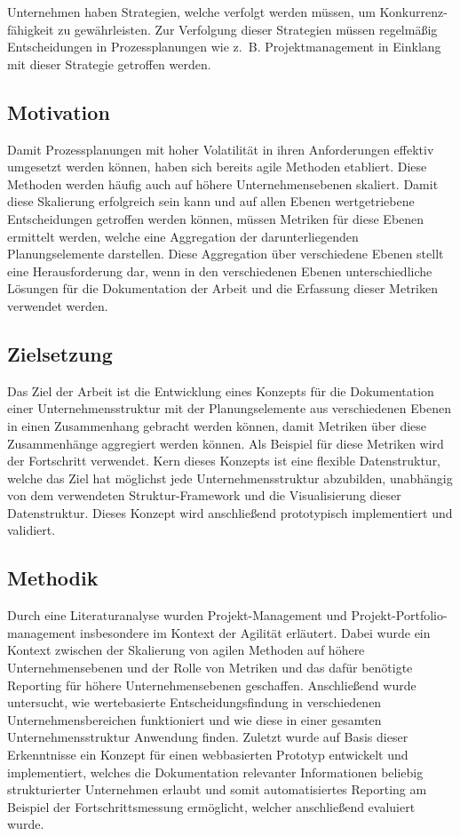 Unternehmen haben Strategien, welche verfolgt werden müssen, um Konkurrenz-fähigkeit zu gewährleisten. Zur Verfolgung dieser Strategien müssen regelmäßig Entscheidungen in Prozessplanungen wie z. B. Projektmanagement in Einklang mit dieser Strategie getroffen werden.

\subsection{Motivation}
Damit Prozessplanungen mit hoher Volatilität in ihren Anforderungen effektiv umgesetzt werden können, haben sich bereits agile Methoden etabliert. Diese Methoden werden häufig auch auf höhere Unternehmensebenen skaliert. Damit diese Skalierung erfolgreich sein kann und auf allen Ebenen wertgetriebene Entscheidungen getroffen werden können, müssen Metriken für diese Ebenen ermittelt werden, welche eine Aggregation der darunterliegenden Planungselemente darstellen. Diese Aggregation über verschiedene Ebenen stellt eine Herausforderung dar, wenn in den verschiedenen Ebenen unterschiedliche Lösungen für die Dokumentation der Arbeit und die Erfassung dieser Metriken verwendet werden.

\subsection{Zielsetzung}
Das Ziel der Arbeit ist die Entwicklung eines Konzepts für die Dokumentation einer Unternehmensstruktur mit der Planungselemente aus verschiedenen Ebenen in einen Zusammenhang gebracht werden können, damit Metriken über diese Zusammenhänge aggregiert werden können. Als Beispiel für diese Metriken wird der Fortschritt verwendet. Kern dieses Konzepts ist eine flexible Datenstruktur, welche das Ziel hat möglichst jede Unternehmensstruktur abzubilden, unabhängig von dem verwendeten Struktur-Framework und die Visualisierung dieser Datenstruktur. Dieses Konzept wird anschließend prototypisch implementiert und validiert.

\subsection{Methodik}
Durch eine Literaturanalyse wurden Projekt-Management und Projekt-Portfolio-management insbesondere im Kontext der Agilität erläutert. Dabei wurde ein Kontext zwischen der Skalierung von agilen Methoden auf höhere Unternehmensebenen und der Rolle von Metriken und das dafür benötigte Reporting für höhere Unternehmensebenen geschaffen. Anschließend wurde untersucht, wie wertebasierte Entscheidungsfindung in verschiedenen Unternehmensbereichen funktioniert und wie diese in einer gesamten Unternehmensstruktur Anwendung finden. Zuletzt wurde auf Basis dieser Erkenntnisse ein Konzept für einen webbasierten Prototyp entwickelt und implementiert, welches die Dokumentation relevanter Informationen beliebig strukturierter Unternehmen erlaubt und somit automatisiertes Reporting am Beispiel der Fortschrittsmessung ermöglicht, welcher anschließend evaluiert wurde.

